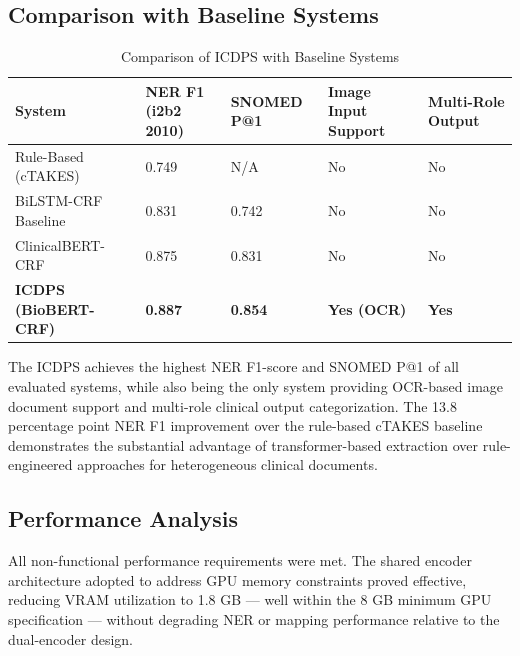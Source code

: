 \subsection{Comparison with Baseline Systems}

\begin{table}[htbp]
\centering
\caption{Comparison of ICDPS with Baseline Systems}
\label{tab:baseline_comparison}
\begin{tabular}{|p{4cm}|p{2.5cm}|p{2.5cm}|p{2.5cm}|p{2.5cm}|}
\hline
\textbf{System} & \textbf{NER F1 (i2b2 2010)} & \textbf{SNOMED P@1} & \textbf{Image Input Support} & \textbf{Multi-Role Output} \\
\hline
Rule-Based (cTAKES) & 0.749 & N/A & No & No \\
\hline
BiLSTM-CRF Baseline & 0.831 & 0.742 & No & No \\
\hline
ClinicalBERT-CRF & 0.875 & 0.831 & No & No \\
\hline
\textbf{ICDPS (BioBERT-CRF)} & \textbf{0.887} & \textbf{0.854} & \textbf{Yes (OCR)} & \textbf{Yes} \\
\hline
\end{tabular}
\end{table}

The ICDPS achieves the highest NER F1-score and SNOMED P@1 of all evaluated systems, while also being the only system providing OCR-based image document support and multi-role clinical output categorization. The 13.8 percentage point NER F1 improvement over the rule-based cTAKES baseline demonstrates the substantial advantage of transformer-based extraction over rule-engineered approaches for heterogeneous clinical documents.

\subsection{Performance Analysis}

All non-functional performance requirements were met. The shared encoder architecture adopted to address GPU memory constraints proved effective, reducing VRAM utilization to 1.8 GB --- well within the 8 GB minimum GPU specification --- without degrading NER or mapping performance relative to the dual-encoder design.

\captionsetup{width=\textwidth}

